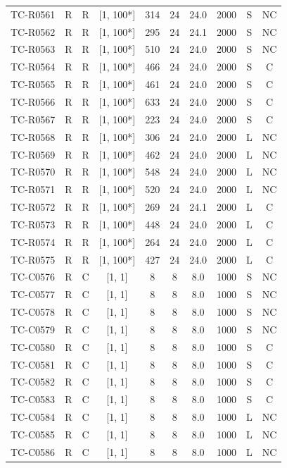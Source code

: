 \begin{longtable}{lccccccccc}
TC-R0561 & R & R & [1, 100*] & 314 & 24 & 24.0 & 2000 & S & NC \\
TC-R0562 & R & R & [1, 100*] & 295 & 24 & 24.1 & 2000 & S & NC \\
TC-R0563 & R & R & [1, 100*] & 510 & 24 & 24.0 & 2000 & S & NC \\
TC-R0564 & R & R & [1, 100*] & 466 & 24 & 24.0 & 2000 & S & C \\
TC-R0565 & R & R & [1, 100*] & 461 & 24 & 24.0 & 2000 & S & C \\
TC-R0566 & R & R & [1, 100*] & 633 & 24 & 24.0 & 2000 & S & C \\
TC-R0567 & R & R & [1, 100*] & 223 & 24 & 24.0 & 2000 & S & C \\
TC-R0568 & R & R & [1, 100*] & 306 & 24 & 24.0 & 2000 & L & NC \\
TC-R0569 & R & R & [1, 100*] & 462 & 24 & 24.0 & 2000 & L & NC \\
TC-R0570 & R & R & [1, 100*] & 548 & 24 & 24.0 & 2000 & L & NC \\
TC-R0571 & R & R & [1, 100*] & 520 & 24 & 24.0 & 2000 & L & NC \\
TC-R0572 & R & R & [1, 100*] & 269 & 24 & 24.1 & 2000 & L & C \\
TC-R0573 & R & R & [1, 100*] & 448 & 24 & 24.0 & 2000 & L & C \\
TC-R0574 & R & R & [1, 100*] & 264 & 24 & 24.0 & 2000 & L & C \\
TC-R0575 & R & R & [1, 100*] & 427 & 24 & 24.0 & 2000 & L & C \\
TC-C0576 & R & C & [1, 1] & 8 & 8 & 8.0 & 1000 & S & NC \\
TC-C0577 & R & C & [1, 1] & 8 & 8 & 8.0 & 1000 & S & NC \\
TC-C0578 & R & C & [1, 1] & 8 & 8 & 8.0 & 1000 & S & NC \\
TC-C0579 & R & C & [1, 1] & 8 & 8 & 8.0 & 1000 & S & NC \\
TC-C0580 & R & C & [1, 1] & 8 & 8 & 8.0 & 1000 & S & C \\
TC-C0581 & R & C & [1, 1] & 8 & 8 & 8.0 & 1000 & S & C \\
TC-C0582 & R & C & [1, 1] & 8 & 8 & 8.0 & 1000 & S & C \\
TC-C0583 & R & C & [1, 1] & 8 & 8 & 8.0 & 1000 & S & C \\
TC-C0584 & R & C & [1, 1] & 8 & 8 & 8.0 & 1000 & L & NC \\
TC-C0585 & R & C & [1, 1] & 8 & 8 & 8.0 & 1000 & L & NC \\
TC-C0586 & R & C & [1, 1] & 8 & 8 & 8.0 & 1000 & L & NC \\

\end{longtable}
